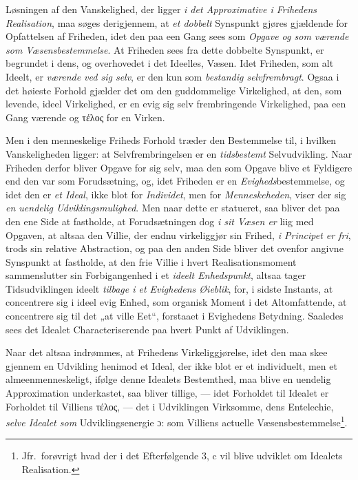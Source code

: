 Løsningen af den Vanskelighed, der ligger \emph{i det Approximative i Frihedens
Realisation}, maa søges derigjennem, at \emph{et dobbelt} Synspunkt gjøres
gjældende for Opfattelsen af Friheden, idet den paa een Gang sees som
\emph{Opgave og som værende som Væsensbestemmelse}. At Friheden sees fra dette
dobbelte Synspunkt, er begrundet i dens, og overhovedet i det Ideelles, Væsen.
Idet Friheden, som alt Ideelt, er \emph{værende ved sig selv}, er den kun som
\emph{bestandig selvfrembragt}. Ogsaa i det høieste Forhold gjælder det om den
guddommelige Virkelighed, at den, som levende, ideel Virkelighed, er en evig sig
selv frembringende Virkelighed, paa een Gang værende og τέλος for en Virken.

 \setcounter{footnote}{0}%
Men i den menneskelige Friheds Forhold træder den Bestemmelse til, i hvilken
Vanskeligheden ligger: at Selvfrembringelsen er en \emph{tidsbestemt}
Selvudvikling. Naar Friheden derfor bliver Opgave for sig selv, maa den som
Opgave blive et Fyldigere end den var som Forudsætning, og, idet Friheden er en
\emph{Evigheds}bestemmelse, og idet den er \emph{et Ideal}, ikke blot for
\emph{Individet}, men for \emph{Menneskeheden}, viser der sig \emph{en uendelig
Udviklingsmulighed}. Men naar dette er statueret, saa bliver det paa den ene Side
at fastholde, at Forudsætningen dog \emph{i sit Væsen er} liig med Opgaven, at
altsaa den Villie, der endnu virkeliggjør sin Frihed, \emph{i Principet er fri},
trods sin relative Abstraction, og paa den anden Side bliver det ovenfor angivne
Synspunkt at fastholde, at den frie Villie i hvert Realisationsmoment
sammenslutter sin Forbigangenhed i et \emph{ideelt Enhedspunkt}, altsaa tager
Tidsudviklingen ideelt \emph{tilbage i et Evighedens Øieblik}, for, i sidste
Instants, at concentrere sig i ideel evig Enhed, som organisk Moment i det
Altomfattende, at concentrere sig til det „at ville Eet“, forstaaet i Evighedens
Betydning. Saaledes sees det Idealet Characteriserende paa hvert Punkt af
Udviklingen.

Naar det altsaa indrømmes, at Frihedens Virkeliggjørelse, idet den maa skee
gjennem en Udvikling henimod et Ideal, der ikke blot er et individuelt, men et
almeenmenneskeligt, ifølge denne Idealets Bestemthed, maa blive en uendelig
Approximation underkastet, saa bliver tillige, --- idet Forholdet til Idealet er
Forholdet til Villiens τέλος, --- det i Udviklingen Virksomme, dens Entelechie,
\emph{selve Idealet som} Udviklingsenergie ɔ: som Villiens actuelle
Væsensbestemmelse\footnote{Jfr.\ forøvrigt hvad der i det Efterfølgende 3, c vil
blive udviklet om Idealets Realisation.}.

